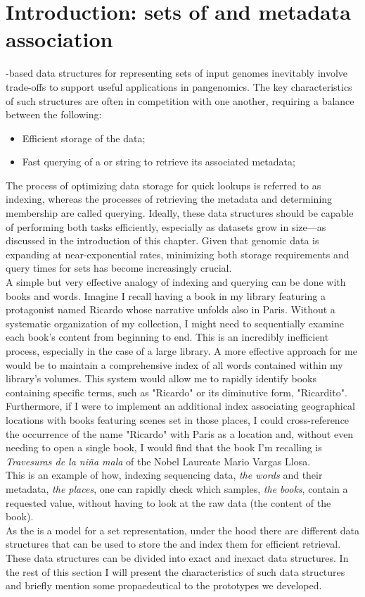 \section{Introduction: sets of \kmers and metadata association}
\kmer-based data structures  for representing sets of input genomes inevitably involve trade-offs to support useful applications in pangenomics.  The key characteristics of such structures are often in competition with one another, requiring a balance between the following:
\begin{itemize}
	\item Efficient storage of the data;
	\item Fast querying of a \kmer or string to retrieve its associated metadata;
\end{itemize}
The process of optimizing data storage for quick lookups is referred to as indexing, whereas the processes of retrieving the metadata and determining membership are called querying. Ideally, these data structures should be capable of performing both tasks efficiently, especially as datasets grow in size—as discussed in the introduction of this chapter. Given that genomic data is expanding at near-exponential rates, minimizing both storage requirements and query times for \kmer sets has become increasingly crucial.\\
A simple but very effective analogy of indexing and querying can be done with books and words.
Imagine I recall having a book in my library featuring a protagonist named Ricardo whose narrative unfolds also in Paris. Without a systematic organization of my collection, I might need to sequentially examine each book's content from beginning to end. This is an incredibly inefficient process, especially in the case of a large library. A more effective approach for me would be to maintain a comprehensive index of all words contained within my library's volumes. This system would allow me to rapidly identify books containing specific terms, such as "Ricardo" or its diminutive form, "Ricardito". Furthermore, if I were to implement an additional index associating geographical locations with books featuring scenes set in those places, I could cross-reference the occurrence of the name "Ricardo" with Paris as a location and, without even needing to open a single book, I would find that the book I'm recalling is \emph{Travesuras de la niña mala} of the Nobel Laureate Mario Vargas Llosa.\\
This is an example of how, indexing sequencing data, \emph{the words} and their metadata, \emph{the places}, one can rapidly check which samples, \emph{the books}, contain a requested value, without having to look at the raw data (the content of the book).\\
As the \dbg is a model for a \kmer set representation, under the hood there are different data structures that can be used to store the \kmers and index them for efficient retrieval. These data structures can be divided into exact and inexact data structures. In the rest of this section I will present the characteristics of such data structures and briefly mention some propaedeutical to the prototypes we developed.

